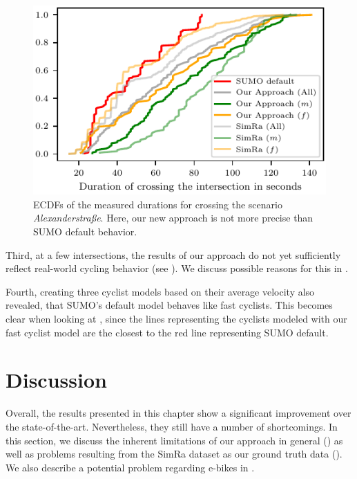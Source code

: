 \begin{figure}
    \centering
    \includegraphics[width=0.7\columnwidth]{fig/im_alex_ecdf_every.pdf}
    \caption{%
        ECDFs of the measured durations for crossing the scenario \textit{Alexanderstraße}.
        Here, our new approach is not more precise than SUMO default behavior.
    }%
    \label{fig:im_alex}
\end{figure}

Third, at a few intersections, the results of our approach do not yet sufficiently reflect real-world cycling behavior (see ).
We discuss possible reasons for this in .

Fourth, creating three cyclist models based on their average velocity also revealed, that SUMO's default model behaves like fast cyclists.
This becomes clear when looking at , since the lines representing the cyclists modeled with our fast cyclist model are the closest to the red line representing SUMO default.


\section{Discussion}
\label{sec:discussion_sumo}
Overall, the results presented in this chapter show a significant improvement over the state-of-the-art.
Nevertheless, they still have a number of shortcomings.
In this section, we discuss the inherent limitations of our approach in general () as well as problems resulting from the SimRa dataset as our ground truth data ().
We also describe a potential problem regarding e-bikes in .

